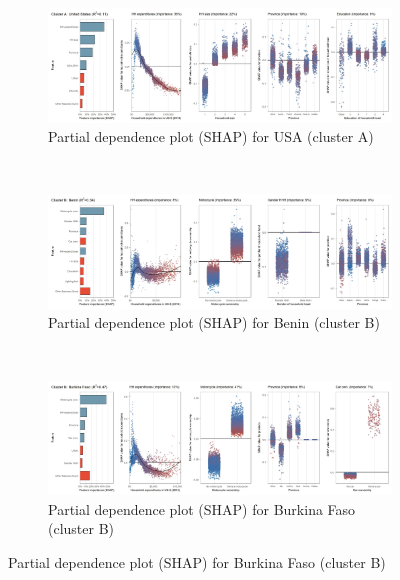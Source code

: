 \begin{figure}[ht!]\ContinuedFloat
    \centering
   \begin{subfigure}[b]{\textwidth}
   \centering
         \caption{Partial dependence plot (SHAP) for USA (cluster A)}
         \label{fig:5b_USA}
         \includegraphics[width=\textwidth]{Figure 5b/Figure_5b_USA}   
         \end{subfigure}
    \\
    \vspace{0.5cm}
   \begin{subfigure}[b]{\textwidth}
         \centering
         \caption{Partial dependence plot (SHAP) for Benin (cluster B)}
         \label{fig:5b_BEN}
         \includegraphics[width=\textwidth]{Figure 5b/Figure_5b_BEN}
         \end{subfigure}
    \\
    \vspace{0.5cm}
   \begin{subfigure}[b]{\textwidth}
   \centering
         \caption{Partial dependence plot (SHAP) for Burkina Faso (cluster B)}
         \label{fig:5b_BFA}
         \includegraphics[width=\textwidth]{Figure 5b/Figure_5b_BFA}
    \end{subfigure}

\end{figure}
